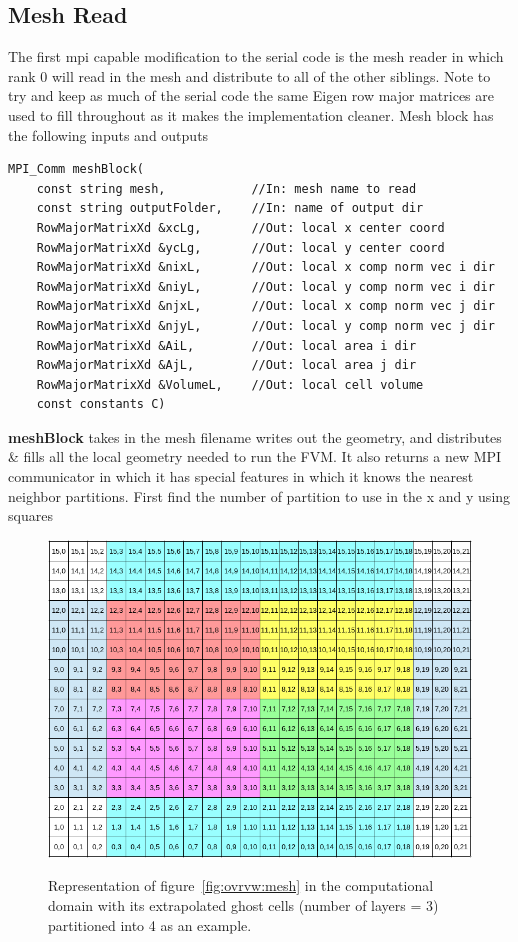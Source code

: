 \documentclass[paper=a4, fontsize=11pt]{scrartcl}
\numberwithin{equation}{section}                %
\numberwithin{figure}{section}                  %
\numberwithin{table}{section}                           %
\begin{document}
\subsection{Mesh Read}

The first mpi capable modification to the serial code is the mesh reader in which rank 0 will read in the mesh and distribute to all of the other siblings. Note to try and keep as much of the serial code the same Eigen row major matrices are used to fill throughout as it makes the implementation cleaner. Mesh block has the following inputs and outputs

\begin{verbatim}
MPI_Comm meshBlock(
    const string mesh,            //In: mesh name to read
    const string outputFolder,    //In: name of output dir
    RowMajorMatrixXd &xcLg,       //Out: local x center coord
    RowMajorMatrixXd &ycLg,       //Out: local y center coord
    RowMajorMatrixXd &nixL,       //Out: local x comp norm vec i dir
    RowMajorMatrixXd &niyL,       //Out: local y comp norm vec i dir
    RowMajorMatrixXd &njxL,       //Out: local x comp norm vec j dir
    RowMajorMatrixXd &njyL,       //Out: local y comp norm vec j dir
    RowMajorMatrixXd &AiL,        //Out: local area i dir
    RowMajorMatrixXd &AjL,        //Out: local area j dir
    RowMajorMatrixXd &VolumeL,    //Out: local cell volume
    const constants C)                  
\end{verbatim}

\textbf{meshBlock} takes in the mesh filename writes out the geometry, and distributes \& fills all the local geometry needed to run the FVM. It also returns a new MPI communicator in which it has special features in which it knows the nearest neighbor partitions. First find the number of partition to use in the x and y using squares

\begin{figure}[!htb]
  \centering
  \includegraphics[width=1.0\linewidth]{fig/16x10compDomain}\label{fig:code:compDom}
  \caption{Representation of figure~\ref{fig:ovrvw:mesh} in the computational domain with its extrapolated ghost cells (number of layers = 3) partitioned into 4 as an example.}
\end{figure}
\end{document}
